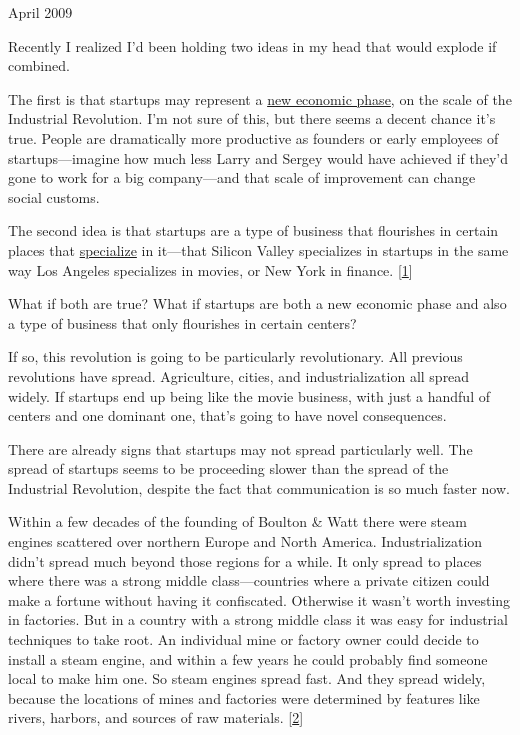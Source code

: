 April 2009

Recently I realized I'd been holding two ideas in my head that would
explode if combined.

The first is that startups may represent a \href{highres.html}{new
economic phase}, on the scale of the Industrial Revolution. I'm not sure
of this, but there seems a decent chance it's true. People are
dramatically more productive as founders or early employees of
startups---imagine how much less Larry and Sergey would have achieved if
they'd gone to work for a big company---and that scale of improvement
can change social customs.

The second idea is that startups are a type of business that flourishes
in certain places that \href{startuphubs.html}{specialize} in it---that
Silicon Valley specializes in startups in the same way Los Angeles
specializes in movies, or New York in finance. {[}\hyperref[f1n]{1}{]}

What if both are true? What if startups are both a new economic phase
and also a type of business that only flourishes in certain centers?

If so, this revolution is going to be particularly revolutionary. All
previous revolutions have spread. Agriculture, cities, and
industrialization all spread widely. If startups end up being like the
movie business, with just a handful of centers and one dominant one,
that's going to have novel consequences.

There are already signs that startups may not spread particularly well.
The spread of startups seems to be proceeding slower than the spread of
the Industrial Revolution, despite the fact that communication is so
much faster now.

Within a few decades of the founding of Boulton \& Watt there were steam
engines scattered over northern Europe and North America.
Industrialization didn't spread much beyond those regions for a while.
It only spread to places where there was a strong middle
class---countries where a private citizen could make a fortune without
having it confiscated. Otherwise it wasn't worth investing in factories.
But in a country with a strong middle class it was easy for industrial
techniques to take root. An individual mine or factory owner could
decide to install a steam engine, and within a few years he could
probably find someone local to make him one. So steam engines spread
fast. And they spread widely, because the locations of mines and
factories were determined by features like rivers, harbors, and sources
of raw materials. {[}\hyperref[f2n]{2}{]}

